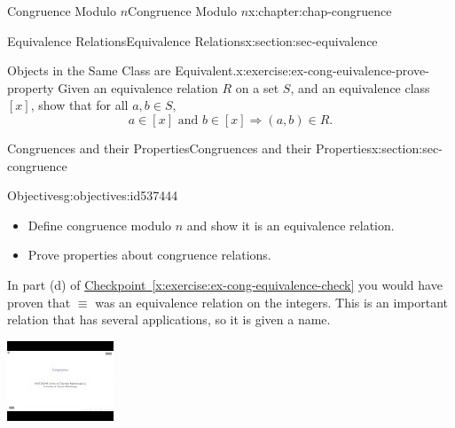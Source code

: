 \documentclass[oneside,10pt,]{book}
\newcommand{\xreffont}{\relax}
\numberwithin{equation}{section}
\newlength{\qrsize}
\newlength{\previewwidth}
\begin{document}
\begin{chapterptx}{Congruence Modulo \(n\)}{}{Congruence Modulo \(n\)}{}{}{x:chapter:chap-congruence}
\begin{sectionptx}{Equivalence Relations}{}{Equivalence Relations}{}{}{x:section:sec-equivalence}
\begin{inlineexercise}{Objects in the Same Class are Equivalent.}{x:exercise:ex-cong-euivalence-prove-property}
Given an equivalence relation \(R\) on a set \(S\), and an equivalence class \([x]\), show that for all \(a, b \in S\),%
\begin{equation*}
a \in [x] \text{ and } b \in [x] \Rightarrow (a,b) \in R\text{.}
\end{equation*}
%
\end{inlineexercise}%
\end{sectionptx}
%
%
\typeout{************************************************}
\typeout{************************************************}
%
\begin{sectionptx}{Congruences and their Properties}{}{Congruences and their Properties}{}{}{x:section:sec-congruence}
\begin{objectives}{Objectives}{g:objectives:id537444}
%
\begin{itemize}[label=\textbullet]
\item{}Define congruence modulo \(n\) and show it is an equivalence relation.%
\item{}Prove properties about congruence relations.%
\end{itemize}
\end{objectives}
In part (d) of \hyperref[x:exercise:ex-cong-equivalence-check]{Checkpoint~{\xreffont\ref{x:exercise:ex-cong-equivalence-check}}} you would have proven that \(\equiv\) was an equivalence relation on the integers. This is an important relation that has several applications, so it is given a name.%
\begin{sidebyside}{1}{0}{0}{0}%
\begin{sbspanel}{1}%
\setlength{\qrsize}{9em}
\setlength{\previewwidth}{\linewidth}
\addtolength{\previewwidth}{-\qrsize}
\begin{tcbraster}[raster columns=2, raster column skip=1pt, raster halign=center, raster force size=false, raster left skip=0pt, raster right skip=0pt]%
\begin{tcolorbox}[previewstyle, width=\previewwidth]%
\includegraphics[width=0.80\linewidth,height=\qrsize,keepaspectratio]{images/video-congruence.jpg}%

\end{tcolorbox}
\end{tcbraster}
\end{sbspanel}
\end{sidebyside}
\end{sectionptx}
\end{chapterptx}
\end{document}

